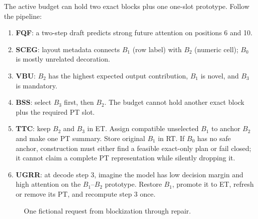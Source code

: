 \documentclass[11pt]{article}
\newcommand{\term}[1]{\textbf{#1}}
\begin{document}
The active budget can hold two exact blocks plus one one-slot prototype. Follow the pipeline:

\begin{enumerate}
  \item \term{FQF}: a two-step draft predicts strong future attention on positions 6 and 10.
  \item \term{SCEG}: layout metadata connects $B_1$ (row label) with $B_2$ (numeric cell); $B_0$
        is mostly unrelated decoration.
  \item \term{VBU}: $B_2$ has the highest expected output contribution, $B_1$ is novel, and
        $B_3$ is mandatory.
  \item \term{BSS}: select $B_3$ first, then $B_2$. The budget cannot hold another exact block
        plus the required PT slot.
  \item \term{TTC}: keep $B_2$ and $B_3$ in ET. Assign compatible unselected $B_1$ to anchor
        $B_2$ and make one PT summary. Store original $B_1$ in RT. If $B_0$ has no safe anchor,
        construction must either find a feasible exact-only plan or fail closed; it cannot claim a
        complete PT representation while silently dropping it.
  \item \term{UGRR}: at decode step 3, imagine the model has low decision margin and high attention
        on the $B_1$--$B_2$ prototype. Restore $B_1$, promote it to ET, refresh or remove its PT,
        and recompute step 3 once.
\end{enumerate}

\begin{figure}[htbp]
\centering
{}
\caption{One fictional request from blockization through repair.}
\label{fig:toy}
\end{figure}
\end{document}
